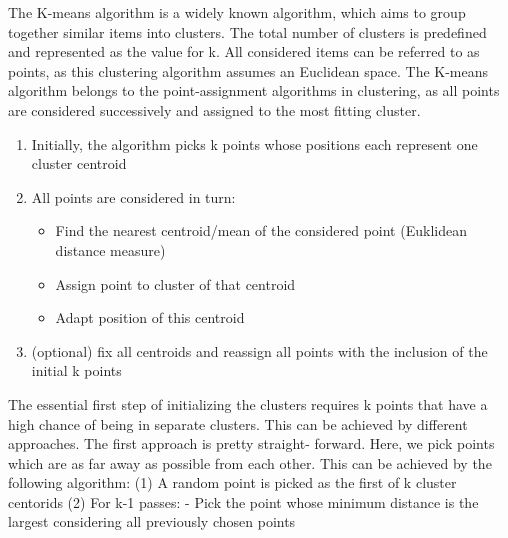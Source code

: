The K-means algorithm is a widely known algorithm, which aims to group together similar items into clusters. 
The total number of clusters is predefined and represented as the value for k. All considered items can be referred to as points, as this clustering algorithm assumes an Euclidean space. The K-means algorithm belongs to the point-assignment algorithms in clustering, as all points are considered successively and assigned to the most fitting cluster. 
\begin{enumerate}
	\item Initially, the algorithm picks k points whose positions each represent one cluster centroid
	\item All points are considered in turn:
	\begin{itemize}
		\item Find the nearest centroid/mean of the considered point (Euklidean distance measure)
		\item Assign point to cluster of that centroid
		\item Adapt position of this centroid
	\end{itemize}	
	
	\item (optional) fix all centroids and reassign all points with the inclusion of the initial k points
	
\end{enumerate}

The essential first step of initializing the clusters requires k points that have a high chance of being in separate clusters. This can be achieved by different approaches. The first approach is pretty straight- forward. Here, we pick points which are as far away as possible from each other. This can be achieved by the following algorithm:
(1)	A random point is picked as the first of k cluster centorids
(2)	For k-1 passes:
-	Pick the point whose minimum distance is the largest considering all previously chosen points
